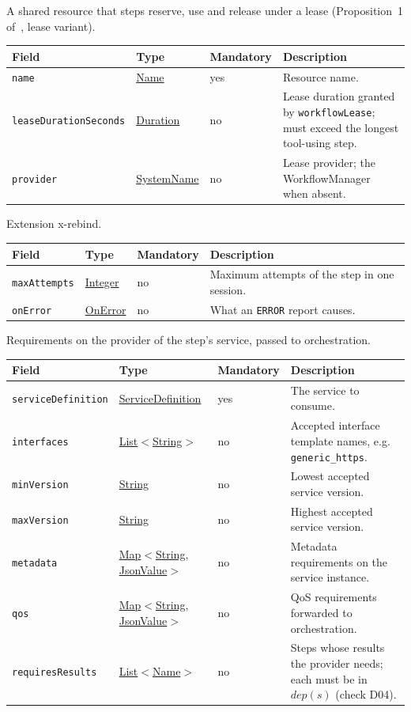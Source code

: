 \documentclass[a4paper]{arrowhead}
\newcommand{\mref}[1]{{\textcolor{ArrowheadPurple}{\hyperref[sec:model:#1]{#1}}}}
\newcommand{\pref}[1]{{\textcolor{ArrowheadGrey}{\hyperref[sec:model:primitives:#1]{#1}}}}
\begin{document}
A shared resource that steps reserve, use and release under a lease (Proposition~1 of~\cite{varga2026}, lease variant).

{\small
\begin{longtable}{|p{3.7cm}|p{4.2cm}|p{1.6cm}|p{6.3cm}|}

\hline
\rowcolor{gray!33} Field & Type & Mandatory & Description \\ \hline
\endhead
\texttt{name} & \pref{Name} & yes & Resource name. \\ \hline
\texttt{leaseDurationSeconds} & \pref{Duration} & no & Lease duration granted by \texttt{workflowLease}; must exceed the longest tool-using step. \\ \hline
\texttt{provider} & \pref{SystemName} & no & Lease provider; the WorkflowManager when absent. \\ \hline
\end{longtable}
}

Extension x-rebind.

{\small
\begin{longtable}{|p{3.7cm}|p{4.2cm}|p{1.6cm}|p{6.3cm}|}

\hline
\rowcolor{gray!33} Field & Type & Mandatory & Description \\ \hline
\endhead
\texttt{maxAttempts} & \pref{Integer} & no & Maximum attempts of the step in one session. \\ \hline
\texttt{onError} & \mref{OnError} & no & What an \texttt{ERROR} report causes. \\ \hline
\end{longtable}
}

Requirements on the provider of the step's service, passed to orchestration.

{\small
\begin{longtable}{|p{3.7cm}|p{4.2cm}|p{1.6cm}|p{6.3cm}|}

\hline
\rowcolor{gray!33} Field & Type & Mandatory & Description \\ \hline
\endhead
\texttt{serviceDefinition} & \pref{ServiceDefinition} & yes & The service to consume. \\ \hline
\texttt{interfaces} & \pref{List}$<$\pref{String}$>$ & no & Accepted interface template names, e.g. \texttt{generic\_https}. \\ \hline
\texttt{minVersion} & \pref{String} & no & Lowest accepted service version. \\ \hline
\texttt{maxVersion} & \pref{String} & no & Highest accepted service version. \\ \hline
\texttt{metadata} & \pref{Map}$<$\pref{String}, \pref{JsonValue}$>$ & no & Metadata requirements on the service instance. \\ \hline
\texttt{qos} & \pref{Map}$<$\pref{String}, \pref{JsonValue}$>$ & no & QoS requirements forwarded to orchestration. \\ \hline
\texttt{requiresResults} & \pref{List}$<$\pref{Name}$>$ & no & Steps whose results the provider needs; each must be in $dep(s)$ (check D04). \\ \hline
\end{longtable}
}
\end{document}

